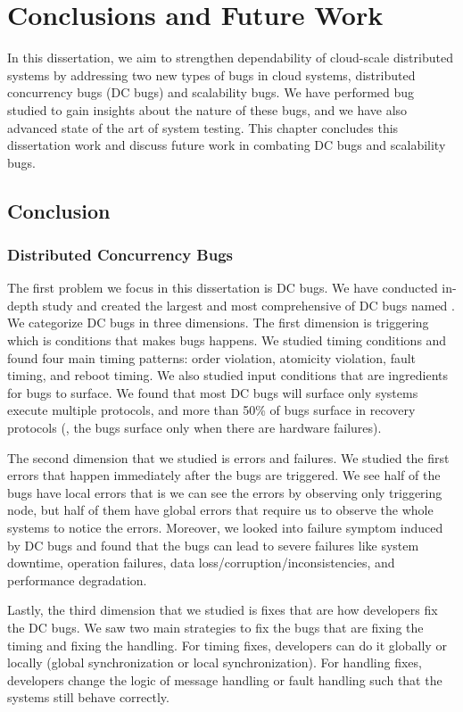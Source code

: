 \chapter{Conclusions and Future Work}
\label{chp-con}

In this dissertation, we aim to strengthen dependability of cloud-scale
distributed systems by addressing two new types of bugs in cloud systems,
distributed concurrency bugs (DC bugs) and scalability bugs. We have performed
bug studied to gain insights about the nature of these bugs, and we have also
advanced state of the art of system testing. This chapter concludes this
dissertation work and discuss future work in combating DC bugs and scalability
bugs.

\section{Conclusion}

\subsection{Distributed Concurrency Bugs}

The first problem we focus in this dissertation is DC bugs. We have conducted
in-depth study and created the largest and most comprehensive of DC bugs named
\taxdc. We categorize DC bugs in three dimensions. The first dimension is
triggering which is conditions that makes bugs happens. We studied timing
conditions and found four main timing patterns: order violation, atomicity
violation, fault timing, and reboot timing. We also studied input conditions
that are ingredients for bugs to surface. We found that most DC bugs will
surface only systems execute multiple protocols, and more than 50\% of bugs
surface in recovery protocols (\ie, the bugs surface only when there are
hardware failures).

The second dimension that we studied is errors and failures. We studied the
first errors that happen immediately after the bugs are triggered. We see half
of the bugs have local errors that is we can see the errors by observing only
triggering node, but half of them have global errors that require us to observe
the whole systems to notice the errors. Moreover, we looked into failure
symptom induced by DC bugs and found that the bugs can lead to severe failures
like system downtime, operation failures, data loss/corruption/inconsistencies,
and performance degradation.

Lastly, the third dimension that we studied is fixes that are how developers fix
the DC bugs. We saw two main strategies to fix the bugs that are fixing the
timing and fixing the handling. For timing fixes, developers can do it globally or
locally (global synchronization or local synchronization). For handling fixes,
developers change the logic of message handling or fault handling such that the
systems still behave correctly.

